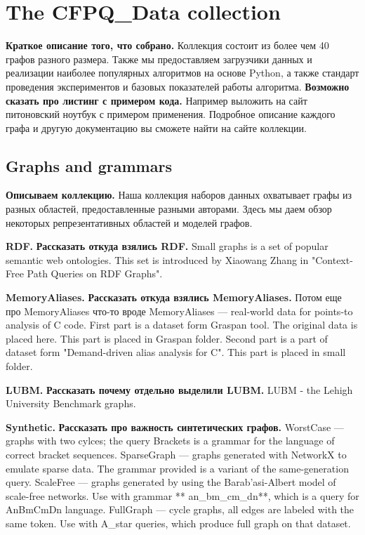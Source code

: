 \section{The CFPQ\_Data collection}
\textbf{Краткое описание того, что собрано.}
Коллекция состоит из более чем 40 графов разного размера.
Также мы предоставляем загрузчики данных и реализации наиболее популярных алгоритмов на основе Python, а также стандарт проведения экспериментов и базовых показателей работы алгоритма.
\textbf{Возможно сказать про листинг с примером кода.}
Например выложить на сайт питоновский ноутбук с примером применения.
Подробное описание каждого графа и другую документацию вы сможете найти на сайте коллекции.

\subsection{Graphs and grammars}
\textbf{Описываем коллекцию.}
Наша коллекция наборов данных охватывает графы из разных областей, предоставленные разными авторами. 
Здесь мы даем обзор некоторых репрезентативных областей и моделей графов.

\textbf{RDF.}
\textbf{Рассказать откуда взялись RDF.}
Small graphs is a set of popular semantic web ontologies. This set is introduced by Xiaowang Zhang in "Context-Free Path Queries on RDF Graphs".

\textbf{MemoryAliases.}
\textbf{Рассказать откуда взялись MemoryAliases.}
Потом еще про MemoryAliases что-то вроде MemoryAliases — real-world data for points-to analysis of C code.
First part is a dataset form Graspan tool. The original data is placed here. This part is placed in Graspan folder.
Second part is a part of dataset form "Demand-driven alias analysis for C". This part is placed in small folder.

\textbf{LUBM.}
\textbf{Рассказать почему отдельно выделили LUBM.}
LUBM - the Lehigh University Benchmark graphs.

\textbf{Synthetic.}
\textbf{Рассказать про важность синтетических графов.}
WorstCase — graphs with two cylces; the query Brackets is a grammar for the language of correct bracket sequences.
SparseGraph — graphs generated with NetworkX to emulate sparse data. The grammar provided is a variant of the same-generation query.
ScaleFree — graphs generated by using the Barab'asi-Albert model of scale-free networks. Use with grammar ** an\_bm\_cm\_dn**, which is a query for AnBmCmDn language.
FullGraph — cycle graphs, all edges are labeled with the same token. Use with A\_star queries, which produce full graph on that dataset.

